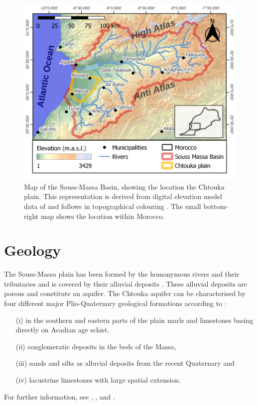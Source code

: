 \begin{figure}[p]
    \centering
    \includegraphics[width=1.0\textwidth]{./img/Map_SoussMassa.pdf}
    \captionsetup{format=hang, labelfont=bf, textfont=it}
    \caption{Map of the Souss-Massa Basin, showing the location the Chtouka plain. This representation is derived from digital elevation model data of \textcite{NASA.SRTM1Arc} and follows in topographical colouring \textcite{Hssaisoune.2017}. The small bottom-right map shows the location within Morocco.}
    \label{Map-SoussMassaRegion}
\end{figure}

\section{Geology}
\label{Sec-SouMaGeology}

The Souss-Massa plain has been formed by the homonymous rivers and their tributaries and is covered by their alluvial deposits \parencite{Hssaisoune.2017}. 
These alluvial deposits are porous and constitute an aquifer. 
The Chtouka aquifer can be characterised by four different major Plio-Quaternary geological formations according to \textcite{Malki.2017}: 
    \begin{itemize}
        \item[(i)] in the southern and eastern parts of the plain marls and limestones basing directly on Acadian age schist, 
        \item[(ii)] conglomeratic deposits in the beds of the Massa, 
        \item[(iii)] sands and silts as alluvial deposits from the recent Quaternary and
        \item[(iv)] lacustrine limestones with large spatial extension.
    \end{itemize}
For further information, see \cite{Choubert.1964}, \cite{Hssaisoune.2017}, \cite{Horn.2021} and \cite{Krimissa.2004}.

